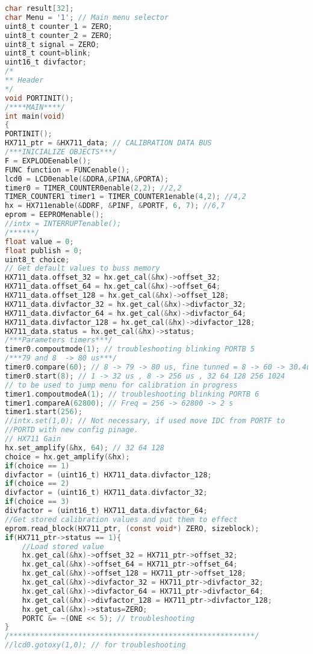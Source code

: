 \begin{lstlisting}[language=C, caption={main.c}, label=main-c, captionpos=b]
char result[32];
char Menu = '1'; // Main menu selector
uint8_t counter_1 = ZERO;
uint8_t counter_2 = ZERO;
uint8_t signal = ZERO;
uint8_t count=blink;
uint16_t divfactor;
/*
** Header
*/
void PORTINIT();
/****MAIN****/
int main(void)
{
PORTINIT();
HX711_ptr = &HX711_data; // CALIBRATION DATA BUS
/***INICIALIZE OBJECTS***/
F = EXPLODEenable();
FUNC function = FUNCenable();
lcd0 = LCD0enable(&DDRA,&PINA,&PORTA);
timer0 = TIMER_COUNTER0enable(2,2); //2,2
TIMER_COUNTER1 timer1 = TIMER_COUNTER1enable(4,2); //4,2
hx = HX711enable(&DDRF, &PINF, &PORTF, 6, 7); //6,7
eprom = EEPROMenable();
//intx = INTERRUPTenable();
/******/
float value = 0;
float publish = 0;
uint8_t choice;
// Get default values to buss memory
HX711_data.offset_32 = hx.get_cal(&hx)->offset_32;
HX711_data.offset_64 = hx.get_cal(&hx)->offset_64;
HX711_data.offset_128 = hx.get_cal(&hx)->offset_128;
HX711_data.divfactor_32 = hx.get_cal(&hx)->divfactor_32;
HX711_data.divfactor_64 = hx.get_cal(&hx)->divfactor_64;
HX711_data.divfactor_128 = hx.get_cal(&hx)->divfactor_128;
HX711_data.status = hx.get_cal(&hx)->status;
/***Parameters timers***/
timer0.compoutmode(1); // troubleshooting blinking PORTB 5
/***79 and 8  -> 80 us***/
timer0.compare(60); // 8 -> 79 -> 80 us, fine tunned = 8 -> 60 -> 30.4us
timer0.start(8); // 1 -> 32 us , 8 -> 256 us , 32 64 128 256 1024
// to be used to jump menu for calibration in progress
timer1.compoutmodeA(1); // troubleshooting blinking PORTB 6
timer1.compareA(62800); // Freq = 256 -> 62800 -> 2 s
timer1.start(256);
//intx.set(1,0); // Not necessary, if used move IDC from PORTF to
//PORTD with new config pinage.
// HX711 Gain
hx.set_amplify(&hx, 64); // 32 64 128
choice = hx.get_amplify(&hx);
if(choice == 1)
divfactor = (uint16_t) HX711_data.divfactor_128;
if(choice == 2)
divfactor = (uint16_t) HX711_data.divfactor_32;
if(choice == 3)
divfactor = (uint16_t) HX711_data.divfactor_64;
//Get stored calibration values and put them to effect
eprom.read_block(HX711_ptr, (const void*) ZERO, sizeblock);
if(HX711_ptr->status == 1){
    //Load stored value 
    hx.get_cal(&hx)->offset_32 = HX711_ptr->offset_32;
    hx.get_cal(&hx)->offset_64 = HX711_ptr->offset_64;
    hx.get_cal(&hx)->offset_128 = HX711_ptr->offset_128;
    hx.get_cal(&hx)->divfactor_32 = HX711_ptr->divfactor_32;
    hx.get_cal(&hx)->divfactor_64 = HX711_ptr->divfactor_64;
    hx.get_cal(&hx)->divfactor_128 = HX711_ptr->divfactor_128;
    hx.get_cal(&hx)->status=ZERO;
    PORTC &= ~(ONE << 5); // troubleshooting
}
/*********************************************************/
//lcd0.gotoxy(1,0); // for troubleshooting

\end{lstlisting}
